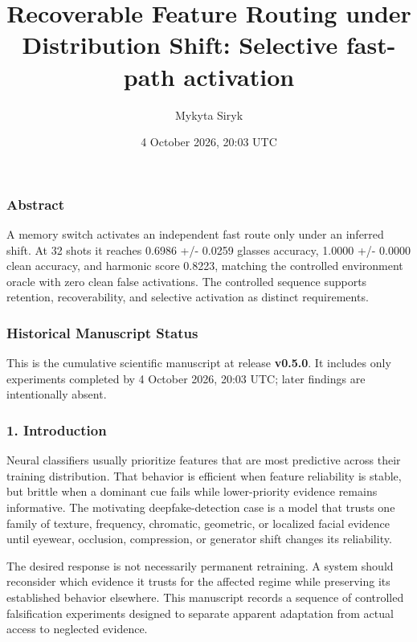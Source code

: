 \documentclass[
  10pt,
]{article}
\title{Recoverable Feature Routing under Distribution Shift: Selective
fast-path activation}
\author{Mykyta Siryk}
\date{4 October 2026, 20:03 UTC}
\begin{document}
\maketitle

\hypertarget{abstract}{%
\subsubsection{Abstract}\label{abstract}}

A memory switch activates an independent fast route only under an
inferred shift. At 32 shots it reaches 0.6986 +/- 0.0259 glasses
accuracy, 1.0000 +/- 0.0000 clean accuracy, and harmonic score 0.8223,
matching the controlled environment oracle with zero clean false
activations. The controlled sequence supports retention, recoverability,
and selective activation as distinct requirements.

\hypertarget{historical-manuscript-status}{%
\subsubsection{Historical Manuscript
Status}\label{historical-manuscript-status}}

This is the cumulative scientific manuscript at release \textbf{v0.5.0}.
It includes only experiments completed by 4 October 2026, 20:03 UTC;
later findings are intentionally absent.

\hypertarget{introduction}{%
\subsubsection{1. Introduction}\label{introduction}}

Neural classifiers usually prioritize features that are most predictive
across their training distribution. That behavior is efficient when
feature reliability is stable, but brittle when a dominant cue fails
while lower-priority evidence remains informative. The motivating
deepfake-detection case is a model that trusts one family of texture,
frequency, chromatic, geometric, or localized facial evidence until
eyewear, occlusion, compression, or generator shift changes its
reliability.

The desired response is not necessarily permanent retraining. A system
should reconsider which evidence it trusts for the affected regime while
preserving its established behavior elsewhere. This manuscript records a
sequence of controlled falsification experiments designed to separate
apparent adaptation from actual access to neglected evidence.
\end{document}
